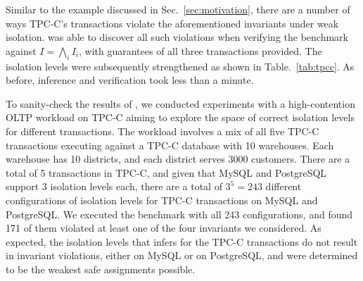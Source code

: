 Similar to the example discussed in Sec.~\ref{sec:motivation}, there
are a number of ways TPC-C's transactions violate the aforementioned
invariants under weak isolation. \tool was able to discover all such
violations when verifying the benchmark against $I =
\bigwedge_{i}I_i$, with guarantees of all three transactions
provided. The isolation levels were subsequently strengthened  as
shown in Table.~\ref{tab:tpcc}.  As before, inference and verification
took less than a minute.


To sanity-check the results of \tool, we conducted experiments with a
high-contention OLTP workload on TPC-C aiming to explore the space of
correct isolation levels for different transactions. The workload
involves a mix of all five TPC-C transactions executing against a
TPC-C database with 10 warehouses. Each warehouse has 10 districts,
and each district serves 3000 customers. There are a total of 5
transactions in TPC-C, and given that MySQL and PostgreSQL support 3
isolation levels each, there are a total of $3^5 = 243$ different
configurations of isolation levels for TPC-C transactions on MySQL and
PostgreSQL. We executed the benchmark with all 243 configurations, and
found 171 of them violated at least one of the four invariants we
considered.  As expected, the isolation levels that \tool infers for the
TPC-C transactions do not result in invariant violations, either on
MySQL or on PostgreSQL, and were determined to be the weakest safe
assignments possible.

